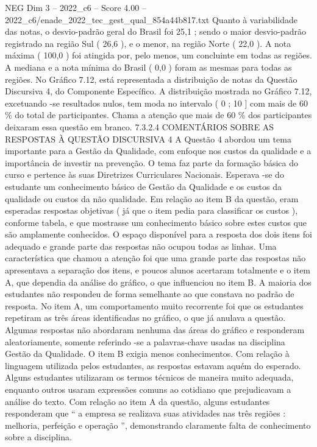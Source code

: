\begin{textsample}{NEG Dim 3 – 2022\_c6 – Score 4.00 – 2022\_c6/enade\_2022\_tec\_gest\_qual\_854a44b817.txt}
Quanto à variabilidade das notas, o desvio-padrão geral do Brasil foi 25,1 ; sendo o maior desvio-padrão registrado na região Sul ( 26,6 ), e o menor, na região Norte ( 22,0 ).
A nota máxima ( 100,0 ) foi atingida por, pelo menos, um concluinte em todas as regiões.
A mediana e a nota mínima do Brasil ( 0,0 ) foram as mesmas para todas as regiões.
No Gráfico 7.12, está representada a distribuição de notas da Questão Discursiva 4, do Componente Específico.
A distribuição mostrada no Gráfico 7.12, excetuando -se resultados nulos, tem moda no intervalo ( 0 ; 10 ] com mais de 60 \% do total de participantes.
Chama a atenção que mais de 60 \% dos participantes deixaram essa questão em branco. 7.3.2.4 COMENTÁRIOS SOBRE AS RESPOSTAS À QUESTÃO DISCURSIVA 4 A Questão 4 abordou um tema importante para a Gestão da Qualidade, com enfoque nos custos da qualidade e a importância de investir na prevenção.
O tema faz parte da formação básica do curso e pertence às suas Diretrizes Curriculares Nacionais.
Esperava -se do estudante um conhecimento básico de Gestão da Qualidade e os custos da qualidade ou custos da não qualidade.
Em relação ao item B da questão, eram esperadas respostas objetivas ( já que o item pedia para classificar os custos ), conforme tabela, e que mostrasse um conhecimento básico sobre estes custos que são amplamente conhecidos.
O espaço disponível para a resposta dos dois itens foi adequado e grande parte das respostas não ocupou todas as linhas.
Uma característica que chamou a atenção foi que uma grande parte das respostas não apresentava a separação dos itens, e poucos alunos acertaram totalmente e o item A, que dependia da análise do gráfico, o que influenciou no item B.
A maioria dos estudantes não respondeu de forma semelhante ao que constava no padrão de resposta.
No item A, um comportamento muito recorrente foi que os estudantes repetiram as três áreas identificadas no gráfico, o que já anulava a questão.
Algumas respostas não abordaram nenhuma das áreas do gráfico e responderam aleatoriamente, somente referindo -se a palavras-chave usadas na disciplina Gestão da Qualidade.
O item B exigia menos conhecimentos.
Com relação à linguagem utilizada pelos estudantes, as respostas estavam aquém do esperado.
Alguns estudantes utilizaram os termos técnicos de maneira muito adequada, enquanto outros usaram expressões comuns ao cotidiano que prejudicavam a análise do texto.
Com relação ao item A da questão, alguns estudantes responderam que “ a empresa se realizava suas atividades nas três regiões : melhoria, perfeição e operação ”, demonstrando claramente falta de conhecimento sobre a disciplina.

\end{textsample}
